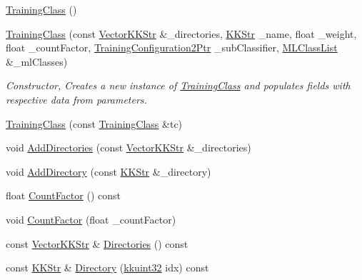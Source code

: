 \begin{DoxyCompactItemize}
\item 
\hyperlink{class_k_k_m_l_l_1_1_training_class_a026d4c2ac6a0c066dcd18bf286c2f2b1}{Training\+Class} ()
\item 
\hyperlink{class_k_k_m_l_l_1_1_training_class_a72528b09154f55629d39e95878f357b8}{Training\+Class} (const \hyperlink{class_k_k_b_1_1_vector_k_k_str}{Vector\+K\+K\+Str} \&\+\_\+directories, \hyperlink{class_k_k_b_1_1_k_k_str}{K\+K\+Str} \+\_\+name, float \+\_\+weight, float \+\_\+count\+Factor, \hyperlink{namespace_k_k_m_l_l_a5da4b334417f8c9e4e2fd5924da7fe62}{Training\+Configuration2\+Ptr} \+\_\+sub\+Classifier, \hyperlink{class_k_k_m_l_l_1_1_m_l_class_list}{M\+L\+Class\+List} \&\+\_\+ml\+Classes)
\begin{DoxyCompactList}\small\item\em Constructor, Creates a new instance of \hyperlink{class_k_k_m_l_l_1_1_training_class}{Training\+Class} and populates fields with respective data from parameters. \end{DoxyCompactList}\item 
\hyperlink{class_k_k_m_l_l_1_1_training_class_aced81b56f2212d1422bf9f6bf6775a8a}{Training\+Class} (const \hyperlink{class_k_k_m_l_l_1_1_training_class}{Training\+Class} \&tc)
\item 
void \hyperlink{class_k_k_m_l_l_1_1_training_class_ae3d695dd12e97003078b083ab3ea685c}{Add\+Directories} (const \hyperlink{class_k_k_b_1_1_vector_k_k_str}{Vector\+K\+K\+Str} \&\+\_\+directories)
\item 
void \hyperlink{class_k_k_m_l_l_1_1_training_class_a600b081302592b296a5de53990f0ec3d}{Add\+Directory} (const \hyperlink{class_k_k_b_1_1_k_k_str}{K\+K\+Str} \&\+\_\+directory)
\item 
float \hyperlink{class_k_k_m_l_l_1_1_training_class_ad81c890b000d4d2236be2cd88fa4c96a}{Count\+Factor} () const 
\item 
void \hyperlink{class_k_k_m_l_l_1_1_training_class_adbd0388ef747281ca5c5ab75d87cf6e8}{Count\+Factor} (float \+\_\+count\+Factor)
\item 
const \hyperlink{class_k_k_b_1_1_vector_k_k_str}{Vector\+K\+K\+Str} \& \hyperlink{class_k_k_m_l_l_1_1_training_class_afe6db8b575f7e26b16ffa24a72cd3f84}{Directories} () const 
\item 
const \hyperlink{class_k_k_b_1_1_k_k_str}{K\+K\+Str} \& \hyperlink{class_k_k_m_l_l_1_1_training_class_ac065995c1794c56a99cc7f0b8bbceaec}{Directory} (\hyperlink{namespace_k_k_b_af8d832f05c54994a1cce25bd5743e19a}{kkuint32} idx) const 

\end{DoxyCompactItemize}
